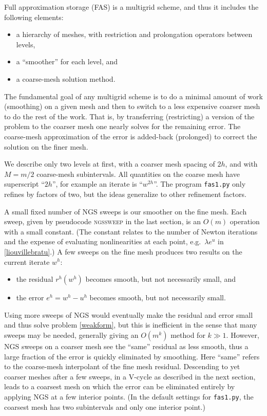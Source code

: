 \documentclass[letterpaper,final,12pt,reqno]{amsart}
\begin{document}
Full approximation storage (FAS) \cite{Brandt1977,Briggsetal2000} is a multigrid scheme, and thus it includes the following elements:
\begin{itemize}
\item a hierarchy of meshes, with restriction and prolongation operators between levels,
\item a ``smoother'' for each level, and
\item a coarse-mesh solution method.
\end{itemize}
The fundamental goal of any multigrid scheme is to do a minimal amount of work (smoothing) on a given mesh and then to switch to a less expensive coarser mesh to do the rest of the work.  That is, by transferring (restricting) a version of the problem to the coarser mesh one nearly solves for the remaining error.  The coarse-mesh approximation of the error is added-back (prolonged) to correct the solution on the finer mesh.

We describe only two levels at first, with a coarser mesh spacing of $2h$, and with $M=m/2$ coarse-mesh subintervals.  All quantities on the coarse mesh have superscript ``$2h$'', for example an iterate is ``$w^{2h}$''.  The program \texttt{fas1.py} only refines by factors of two, but the ideas generalize to other refinement factors.

A small fixed number of NGS sweeps is our smoother on the fine mesh.  Each sweep, given by pseudocode \textsc{ngssweep} in the last section, is an $O(m)$ operation with a small constant.  (The constant relates to the number of Newton iterations and the expense of evaluating nonlinearities at each point, e.g.~$\lambda e^u$ in \eqref{liouvillebratu}.)  A few sweeps on the fine mesh produces two results on the current iterate $w^h$:
\begin{itemize}
\item the residual $r^h(w^h)$ becomes smooth, but not necessarily small, and
\item the error $e^h = w^h - u^h$ becomes smooth, but not necessarily small.
\end{itemize}

Using more sweeps of NGS would eventually make the residual and error small and thus solve problem \eqref{weakform}, but this is inefficient in the sense that many sweeps may be needed, generally giving an $O(m^k)$ method for $k\gg 1$.  However, NGS sweeps on a coarser mesh see the ``same'' residual as less smooth, thus a large fraction of the error is quickly eliminated by smoothing.  Here ``same'' refers to the coarse-mesh interpolant of the fine mesh residual.  Descending to yet coarser meshes after a few sweeps, in a V-cycle as described in the next section, leads to a coarsest mesh on which the error can be eliminated entirely by applying NGS at a few interior points.  (In the default settings for \texttt{fas1.py}, the coarsest mesh has two subintervals and only one interior point.)
\end{document}
